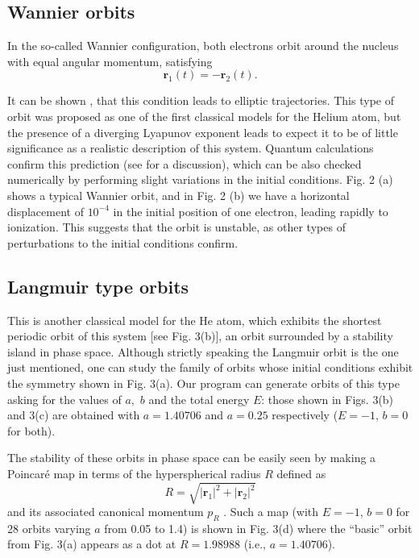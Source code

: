 \documentclass[thmsa]{article}
\begin{document}
\subsection{Wannier orbits}

In the so-called Wannier configuration, both electrons orbit around the
nucleus with equal angular momentum, satisfying 
\begin{equation}
\mathbf{r}_1\left( t\right) =-\mathbf{r}_2\left( t\right) .
\end{equation}

It can be shown \cite{Richter(clasicos)}, that this condition leads to
elliptic trajectories. This type of orbit was proposed as one of the first
classical models for the Helium atom, but the presence of a diverging
Lyapunov exponent leads to expect it to be of little significance as a
realistic description of this system. Quantum calculations confirm this
prediction (see \cite{Richter(clasicos)} for a discussion), which can be
also checked numerically by performing slight variations in the initial
conditions. Fig. 2 (a) shows a typical Wannier orbit, and in Fig. 2 (b) we
have a horizontal displacement of $10^{-4}$ in the initial position of one
electron, leading rapidly to ionization. This suggests that the orbit is
unstable, as other types of perturbations to the initial conditions confirm.

\subsection{Langmuir type orbits}

This is another classical model for the He atom, which exhibits the shortest
periodic orbit of this system [see Fig. 3(b)], an orbit surrounded by a
stability island in phase space. Although strictly speaking the Langmuir
orbit is the one just mentioned, one can study the family of orbits whose
initial conditions exhibit the symmetry shown in Fig. 3(a). Our program can
generate orbits of this type asking for the values of $a,$ $b$ and the total
energy $E$: those shown in Figs. 3(b) and 3(c) are obtained with $a=1.40706$
and $a=0.25$ respectively ($E=-1$, $b=0$ for both).

The stability of these orbits in phase space can be easily seen by making a
Poincar\'e map in terms of the hyperspherical radius $R$ defined as 
\begin{equation}
R=\sqrt{\left| \mathbf{r}_1\right| ^2+\left| \mathbf{r}_2\right| ^2}
\label{hyperrad}
\end{equation}
and its associated canonical momentum $p_R$ \cite{Mahecha(LAMP)}. Such a map
(with $E=-1$, $b=0$ for 28 orbits varying $a$ from 0.05 to 1.4) is shown in
Fig. 3(d) where the ``basic'' orbit from Fig. 3(a) appears as a dot at $%
R=1.98988$ (i.e., $a=1.40706$).
\end{document}
